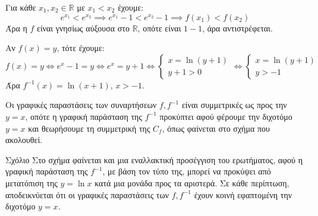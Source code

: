 \begin{alist}
    \item [α)] Για κάθε $x_1, x_2 \in \mathbb{R}$ με $x_1 < x_2$ έχουμε:
    \[ e^{x_1} < e^{x_2} \implies e^{x_1} - 1 < e^{x_2} - 1 \implies f(x_1) < f(x_2) \]
    Άρα η $f$ είναι γνησίως αύξουσα στο $\mathbb{R}$, οπότε είναι $1-1$, άρα αντιστρέφεται.

    \item [β)] Αν $f(x)=y$, τότε έχουμε:
    \[ f(x)=y \iff e^x - 1 = y \iff e^x = y+1 \iff \left\{ \begin{array}{l} x = \ln(y+1) \\ y+1 > 0 \end{array} \right. \iff \left\{ \begin{array}{l} x = \ln(y+1) \\ y > -1 \end{array} \right. \]
    Άρα $f^{-1}(x)=\ln(x+1)$, $x > -1$.

    \item [γ)] Οι γραφικές παραστάσεις των συναρτήσεων $f, f^{-1}$ είναι συμμετρικές ως προς την $y=x$, οπότε η γραφική παράσταση της $f^{-1}$ προκύπτει αφού φέρουμε την διχοτόμο $y=x$ και θεωρήσουμε τη συμμετρική της $C_f$, όπως φαίνεται στο σχήμα που ακολουθεί.
\end{alist}

Σχόλιο
Στο σχήμα φαίνεται και μια εναλλακτική προσέγγιση του ερωτήματος, αφού η γραφική παράσταση της $f^{-1}$, με βάση τον τύπο της, μπορεί να προκύψει από μετατόπιση της $y=\ln x$ κατά μια μονάδα προς τα αριστερά.
Σε κάθε περίπτωση, αποδεικνύεται ότι οι γραφικές παραστάσεις των $f, f^{-1}$ έχουν κοινή εφαπτομένη την διχοτόμο $y=x$.